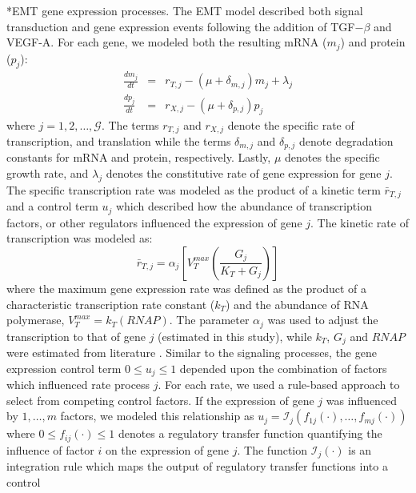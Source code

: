 \documentclass[12pt]{article}
\makeatletter
\renewcommand\subsubsection{\@startsection
	{subsubsection}{2}{0mm}
	{-0.05in}
	{-0.5\baselineskip}
	{\normalfont\normalsize\itshape}}
\makeatother
\begin{document}
\subsubsection*{EMT gene expression processes.}
The EMT model described both signal transduction and gene expression events following the addition of TGF$-\beta$ and VEGF-A.
For each gene, we modeled both the resulting mRNA ($m_{j}$) and protein ($p_{j}$):
\begin{eqnarray}
	\frac{dm_{j}}{dt} &=& r_{T,j} - \left(\mu+\delta_{m,j}\right)m_{j}+\lambda_{j}\\
	\frac{dp_{j}}{dt} &=& r_{X,j} - \left(\mu+\delta_{p,j}\right)p_{j}
\end{eqnarray}where $j=1,2,\dots,\mathcal{G}$.
The terms $r_{T,j}$ and $r_{X,j}$ denote the specific rate of transcription, and translation while
the terms $\delta_{m,j}$ and $\delta_{p,j}$ denote degradation constants for mRNA and protein, respectively.
Lastly, $\mu$ denotes the specific growth rate, and $\lambda_{j}$ denotes the constitutive rate of gene expression for gene $j$.
The specific transcription rate was modeled as the product of a kinetic term $\bar{r}_{T,j}$ and a control term $u_{j}$ which described how the
abundance of transcription factors, or other regulators influenced the expression of gene $j$. The kinetic rate of transcription was modeled as:
\begin{equation}
	\bar{r}_{T,j} = \alpha_{j}\left[V^{max}_{T}\left(\frac{G_{j}}{K_{T}+G_{j}}\right)\right]
\end{equation}where the maximum gene expression rate was defined as the product of a characteristic transcription rate constant ($k_{T}$)
and the abundance of RNA polymerase, $V^{max}_{T} = k_{T}\left(RNAP\right)$. The parameter $\alpha_{j}$ was used to adjust the transcription to that of gene $j$
(estimated in this study), while $k_{T}$, $G_{j}$ and $RNAP$ were estimated from literature \citep{Milo:2010aa}.
Similar to the signaling processes, the gene expression control term $0\leq u_{j}\leq 1$ depended upon the combination of factors which influenced rate process $j$.
For each rate, we used a rule-based approach to select from competing control factors.
If the expression of gene $j$ was influenced by $1,\dots,m$ factors, we modeled this relationship as
$u_{j}=\mathcal{I}_{j}\left(f_{1j}\left(\cdot\right),\hdots,f_{mj}\left(\cdot\right)\right)$
where $0\leq f_{ij}\left(\cdot\right)\leq 1$ denotes a regulatory transfer function quantifying the influence of factor $i$ on the expression of gene $j$.
The function $\mathcal{I}_{j}\left(\cdot\right)$ is an integration rule which maps the output of regulatory transfer functions into a control
\end{document}
